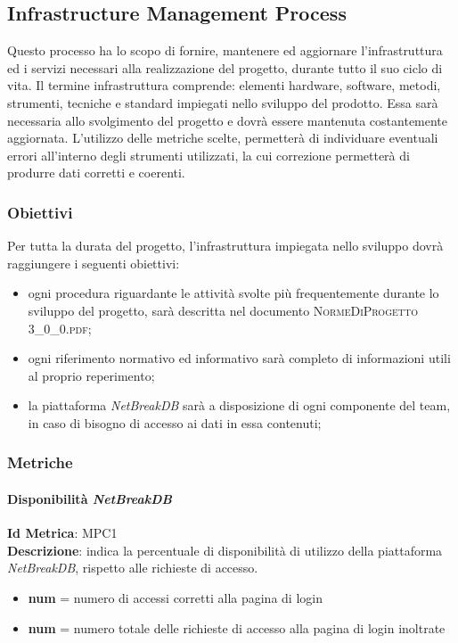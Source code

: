 	\subsection{Infrastructure Management Process}
	Questo processo ha lo scopo di fornire, mantenere ed aggiornare l’infrastruttura ed i servizi necessari alla realizzazione del progetto, durante tutto il suo ciclo di vita. Il termine infrastruttura comprende: elementi hardware, software, metodi, strumenti, tecniche e standard impiegati nello sviluppo del prodotto.
	Essa sarà necessaria allo svolgimento del progetto e dovrà essere mantenuta costantemente aggiornata.
	L'utilizzo delle metriche scelte, permetterà di individuare eventuali errori all’interno degli strumenti utilizzati, la cui correzione permetterà di produrre dati corretti e coerenti.
		
		\subsubsection{Obiettivi}
		Per tutta la durata del progetto, l’infrastruttura impiegata nello sviluppo dovrà raggiungere i seguenti obiettivi:
		\begin{itemize}
			\item ogni procedura riguardante le attività svolte più frequentemente durante lo sviluppo del
			progetto, sarà descritta nel documento \textsc{NormeDiProgetto 3\_0\_0.pdf};
			\item ogni riferimento normativo ed informativo sarà completo di informazioni utili al proprio
			reperimento;
			\item la piattaforma \textit{NetBreakDB} sarà a disposizione di ogni componente del team, in caso di bisogno di accesso ai dati in essa contenuti;
		\end{itemize}
		\subsubsection{Metriche}
			\paragraph{Disponibilità \textit{NetBreakDB}}
			\textbf{Id Metrica}: \hypertarget{MPC1}{MPC1}\\
			\textbf{Descrizione}: indica la percentuale di disponibilità di utilizzo della piattaforma \textit{NetBreakDB}, rispetto alle richieste di accesso.
			
			\begin{itemize}
				\item \textbf{num} = numero di accessi corretti alla pagina di login
				\item \textbf{num} = numero totale delle richieste di accesso alla pagina di login inoltrate
			\end{itemize}
			

